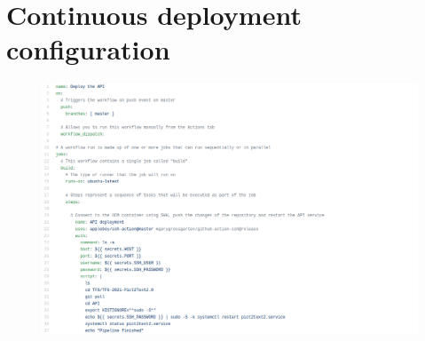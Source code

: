 
\chapter{Continuous deployment configuration}
\label{Appendix:Key1}

\begin{figure}[h]
  \centering
\includegraphics[width=18cm]{Imagenes/Apendix/cd}
\end{figure}

